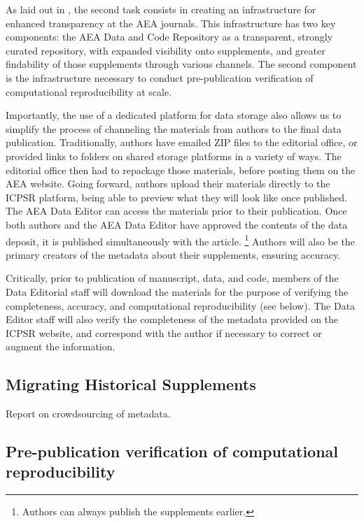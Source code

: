 \documentclass[PP]{AEA}
\newcommand{\aeadcr}{AEA Data and Code Repository}
\begin{document}
As laid out in \citet{10.1257/pandp.108.745}, the second task consists in creating an infrastructure for enhanced transparency at the AEA journals. This infrastructure has two key components: the \aeadcr{} as a transparent, strongly curated repository, with expanded visibility onto supplements, and greater findability of those supplements through various channels. The second component is the infrastructure necessary to conduct pre-publication verification of computational reproducibility at scale.








Importantly, the use of a dedicated platform for data storage also allows us to simplify the process of channeling  the materials from authors to the final data publication. Traditionally, authors have  emailed ZIP files to the editorial office, or provided links to folders on shared storage platforms in a variety of ways. The editorial office then had to repackage those materials, before posting them on the AEA website. Going forward, authors  upload their materials directly to the ICPSR platform, being able to preview what they will look like once published. The AEA Data Editor can access the materials prior to their publication. Once both authors and the AEA Data Editor have approved the contents of the data deposit, it is published simultaneously with the article.%
\footnote{Authors can always publish the supplements earlier.} Authors will also be the primary creators of the metadata about their supplements, ensuring accuracy.

Critically, prior to publication of manuscript, data, and code,  members of the Data Editorial staff will download the materials for the purpose of verifying the completeness, accuracy, and computational reproducibility (see below). The Data Editor staff will also verify the completeness of the metadata provided on the ICPSR website, and correspond with the author if necessary to correct or augment the information. 

\subsection{Migrating Historical Supplements}
\label{sec:migration}


Report on crowdsourcing of metadata.

\FloatBarrier

\subsection{Pre-publication verification of computational reproducibility}
\label{sec:verification}
\end{document}
